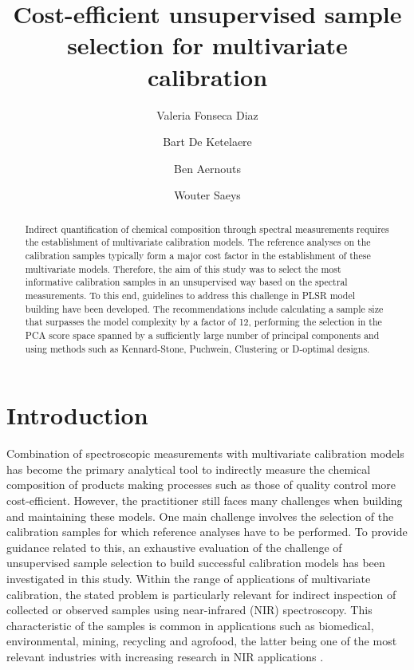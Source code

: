 \documentclass[journal=ancham,manuscript=article]{achemso}
\author{Valeria Fonseca Diaz}
\author{Bart De Ketelaere}
\author{Ben Aernouts}
\author{Wouter Saeys}
\affiliation[KU Leuven]
{KU Leuven, Mechatronics, Biostatistics and Sensors (MeBioS), Kasteelpark
Arenberg 30, 3001 Leuven, Belgium}
\title[An \textsf{achemso} demo]
  {Cost-efficient unsupervised sample selection for multivariate calibration}
\begin{document}
\begin{abstract}
Indirect quantification of chemical composition through spectral measurements requires the establishment of multivariate calibration models. The reference analyses on the calibration samples typically form a major cost factor in the establishment of these multivariate models. Therefore, the aim of this study was to select the most informative calibration samples in an unsupervised way based on the spectral measurements. To this end, guidelines to address this challenge in PLSR model building have been developed. The recommendations include calculating a sample size that surpasses the model complexity by a factor of 12, performing the selection in the PCA score space spanned by a sufficiently large number of principal components and using methods such as Kennard-Stone, Puchwein, Clustering or D-optimal designs.

\end{abstract}%


\section{Introduction}\label{introduction}

Combination of spectroscopic measurements with multivariate calibration models has become the primary analytical tool to indirectly measure the chemical composition of products making processes such as those of quality control more cost-efficient. However, the practitioner still faces many challenges when building and maintaining these models. One main challenge involves the selection of the calibration samples for which reference analyses have to be performed. To provide guidance related to this, an exhaustive evaluation of the challenge of unsupervised sample selection to build successful calibration models has been investigated in this study. Within the range of applications of multivariate calibration, the stated problem is particularly relevant for indirect inspection of collected or observed samples using near-infrared (NIR) spectroscopy. This characteristic of the samples is common in applications such as biomedical, environmental, mining, recycling and agrofood, the latter being one of the most relevant industries with increasing research in NIR applications \cite{Au2020,Diaz-Olivares2020, Saeys2005, Bobelyn2010}.  
\end{document}
